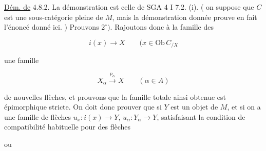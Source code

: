 \uline{Dém. de} 4.8.2. La démonstration est  celle de SGA 4 I 7.2. (i). ( on suppose que $C$ est une sous-catégorie pleine de $M$, mais la démonstration donnée prouve en fait l'énoncé donné ici. ) Prouvons $2^\circ)$. Rajoutons donc à la famille des

\[ i(x)\longrightarrow X \qquad (x\in\mathrm{Ob}\,C_{/X} \]

une famille

\[ X_{\alpha}\xrightarrow{p_{\alpha}}X \qquad (\alpha\in A) \]

de nouvelles flèches, et prouvons que la famille totale ainsi obtenue est  épimorphique stricte. On doit donc prouver que si $Y$ est un objet de $M$, et si on a une famille de flèches $u_x:i(x)\longrightarrow Y$, $u_\alpha:Y_\alpha\longrightarrow Y$, satisfaisant la condition  de compatibilité habituelle pour des  flèches


ou

